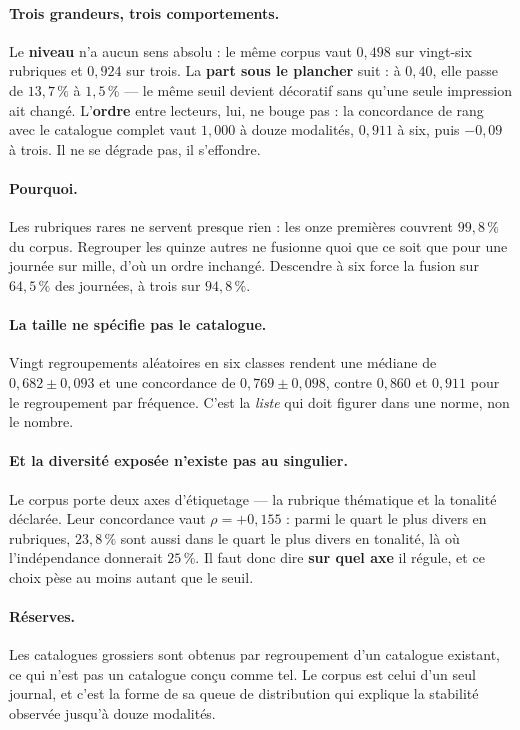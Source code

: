 \documentclass[11pt,a4paper]{article}
\begin{document}
\paragraph{Trois grandeurs, trois comportements.} Le \textbf{niveau} n'a aucun sens absolu : le
même corpus vaut $0{,}498$ sur vingt-six rubriques et $0{,}924$ sur trois. La \textbf{part sous
le plancher} suit : à $0{,}40$, elle passe de $13{,}7\,\%$ à $1{,}5\,\%$ --- le même seuil
devient décoratif sans qu'une seule impression ait changé. L'\textbf{ordre} entre lecteurs, lui,
ne bouge pas : la concordance de rang avec le catalogue complet vaut $1{,}000$ à douze modalités,
$0{,}911$ à six, puis $-0{,}09$ à trois. Il ne se dégrade pas, il s'effondre.

\paragraph{Pourquoi.} Les rubriques rares ne servent presque rien : les onze premières couvrent
$99{,}8\,\%$ du corpus. Regrouper les quinze autres ne fusionne quoi que ce soit que pour une
journée sur mille, d'où un ordre inchangé. Descendre à six force la fusion sur $64{,}5\,\%$ des
journées, à trois sur $94{,}8\,\%$.

\paragraph{La taille ne spécifie pas le catalogue.} Vingt regroupements aléatoires en six classes
rendent une médiane de $0{,}682 \pm 0{,}093$ et une concordance de $0{,}769 \pm 0{,}098$, contre
$0{,}860$ et $0{,}911$ pour le regroupement par fréquence. C'est la \emph{liste} qui doit figurer
dans une norme, non le nombre.

\paragraph{Et la diversité exposée n'existe pas au singulier.} Le corpus porte deux axes
d'étiquetage --- la rubrique thématique et la tonalité déclarée. Leur concordance vaut
$\rho = +0{,}155$ : parmi le quart le plus divers en rubriques, $23{,}8\,\%$ sont aussi dans le
quart le plus divers en tonalité, là où l'indépendance donnerait $25\,\%$. Il faut donc
dire \textbf{sur quel axe} il régule, et ce choix pèse au moins autant que le seuil.

\paragraph{Réserves.} Les catalogues grossiers sont obtenus par regroupement d'un catalogue
existant, ce qui n'est pas un catalogue conçu comme tel. Le corpus est celui d'un seul journal, et
c'est la forme de sa queue de distribution qui explique la stabilité observée jusqu'à douze
modalités.
\end{document}
